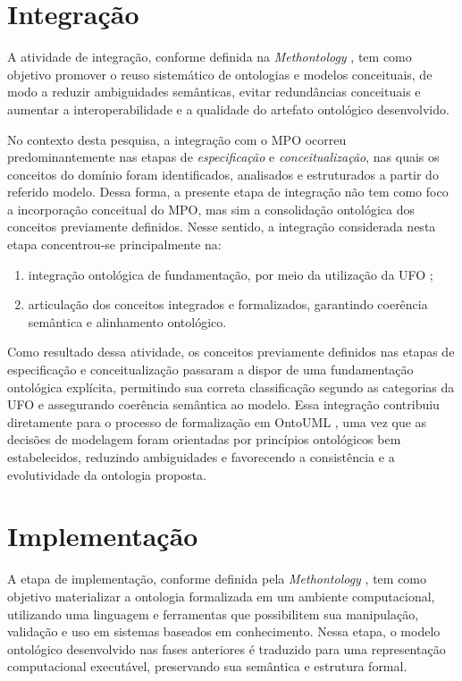 \section{Integração}
A atividade de integração, conforme definida na \textit{Methontology} \cite{fernandez1997methontology}, tem como objetivo promover o reuso sistemático de ontologias e modelos conceituais, de modo a reduzir ambiguidades semânticas, evitar redundâncias conceituais e aumentar a interoperabilidade e a qualidade do artefato ontológico desenvolvido. 

No contexto desta pesquisa, a integração com o MPO \cite{vieira2022thesis} ocorreu predominantemente nas etapas de \textit{especificação} e \textit{conceitualização}, nas quais os conceitos do domínio foram identificados, analisados e estruturados a partir do referido modelo. Dessa forma, a presente etapa de integração não tem como foco a incorporação conceitual do MPO, mas sim a consolidação ontológica dos conceitos previamente definidos. Nesse sentido, a integração considerada nesta etapa concentrou-se principalmente na:
\begin{enumerate}
    \item integração ontológica de fundamentação, por meio da utilização da UFO \cite{guizzardi2008grounding};
    \item articulação dos conceitos integrados e formalizados, garantindo coerência semântica e alinhamento ontológico.
\end{enumerate}

Como resultado dessa atividade, os conceitos previamente definidos nas etapas de especificação e conceitualização passaram a dispor de uma fundamentação ontológica explícita, permitindo sua correta classificação segundo as categorias da UFO \cite{vieira2022thesis} e assegurando coerência semântica ao modelo. Essa integração contribuiu diretamente para o processo de formalização em OntoUML \cite{ontouml_readthedocs}, uma vez que as decisões de modelagem foram orientadas por princípios ontológicos bem estabelecidos, reduzindo ambiguidades e favorecendo a consistência e a evolutividade da ontologia proposta.

\section{Implementação}
A etapa de implementação, conforme definida pela \textit{Methontology} \cite{fernandez1997methontology}, tem como objetivo materializar a ontologia formalizada em um ambiente computacional, utilizando uma linguagem e ferramentas que possibilitem sua manipulação, validação e uso em sistemas baseados em conhecimento. Nessa etapa, o modelo ontológico desenvolvido nas fases anteriores é traduzido para uma representação computacional executável, preservando sua semântica e estrutura formal.

